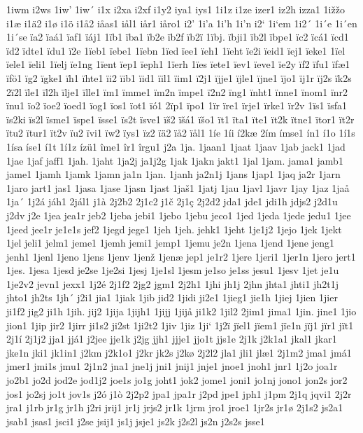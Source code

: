 1iwm
i2ws
1iw'
1iw´
i1x
i2xa
i2xf
i1y2
iya1
iys1
1i1z
i1ze
izer1
iz2h
izza1
1ižžo
i1æ
i1ä2
i1ø
i1ö
i1å2
iåas1
iål1
iår1
iåro1
i2'
1i'a
1i'h
1i'n
i2`
1i`em
1i2´
1i´e
1i´en
1i´se
ïa2
ïaá1
ïaf1
ïáj1
1ïb1
ïba1
ïb2e
ïb2f
ïb2ï
1ïbj.
ïbji1
ïb2l
ïbpe1
ïc2
ïcá1
ïcd1
ïd2
ïdte1
ïdu1
ï2e
1ïeb1
ïebe1
1ïebn
1ïed
ïee1
ïeh1
1ïeht
ïe2i
ïeid1
ïej1
ïeke1
1ïel
ïele1
ïeli1
1ïelj
ïe1ng
1ïent
ïep1
ïeph1
1ïerh
1ïes
ïete1
ïev1
ïeve1
ïe2y
ïf2
ïfu1
ïfæ1
ïfö1
ïg2
ïgke1
ïh1
ïhte1
ïi2
ïib1
ïid1
ïil1
ïim1
ï2j1
ïjje1
ïjle1
ïjne1
ïjo1
ïj1r
ïj2s
ïk2s
2ï2l
ïle1
ïl2h
ïlje1
ïlle1
ïm1
ïmme1
ïm2n
ïmpe1
ï2n2
ïng1
ïnht1
ïnne1
ïnom1
ïnr2
ïnu1
ïo2
ïoe2
ïoed1
ïog1
ïos1
ïot1
ïó1
2ïp1
ïpo1
1ïr
ïre1
ïrje1
ïrke1
ïr2v
1ïs1
ïsfa1
ïs2ki
ïs2l
ïsme1
ïspe1
ïsse1
ïs2t
ïsve1
ïš2
ïšá1
ïšo1
ït1
ïta1
ïte1
ït2k
ïtne1
ïtor1
ït2r
ïtu2
ïtur1
ït2v
ïu2
ïvi1
ïw2
ïys1
ïz2
ïä2
ïå2
ïål1
1íe
1íi
í2kæ
2ím
ímse1
ín1
í1o
1í1s
1ísa
íse1
í1t
1í1z
ízü1
îme1
îr1
îrgu1
j2a
1ja.
1jaan1
1jaat
1jaav
1jab
jack1
1jad
1jae
1jaf
jaff1
1jah.
1jaht
1ja2j
ja1j2g
1jak
1jakn
jakt1
1jal
1jam.
jama1
jamb1
jame1
1jamh
1jamk
1jamn
ja1n
1jan.
1janh
ja2n1j
1jans
1jap1
1jaq
ja2r
1jarn
1jaro
jart1
jas1
1jasa
1jase
1jasn
1jast
1jaš1
1jatj
1jau
1javl
1javr
1jay
1jaz
1jaå
1ja´
1j2á
jáh1
2jál1
j1à
2j2b2
2j1c2
j1č
2j1ç
2j2d2
jda1
jde1
jdi1h
jdjs2
j2d1u
j2dv
j2e
1jea
jea1r
jeb2
1jeba
jebi1
1jebo
1jebu
jeco1
1jed
1jeda
1jede
jedu1
1jee
1jeed
jee1r
je1e1s
jef2
1jegd
jege1
1jeh
1jeh.
jehk1
1jeht
1je1j2
1jejo
1jek
1jekt
1jel
jeli1
jelm1
jeme1
1jemh
jemi1
jemp1
1jemu
je2n
1jena
1jend
1jene
jeng1
jenh1
1jenl
1jeno
1jens
1jenv
1jenž
1jenæ
jep1
je1r2
1jere
1jeri1
1jer1n
1jero
jert1
1jes.
1jesa
1jesd
je2se
1je2si
1jesj
1je1sl
1jesm
je1so
je1ss
jesu1
1jesv
1jet
je1u
1je2v2
jevn1
jexx1
1j2é
2j1f2
2jg2
jgm1
2j2h1
1jhi
jh1j
2jhn
jhta1
jhti1
jh2t1j
jhto1
jh2ts
1jh´
j2i1
jia1
1jiak
1jib
jid2
1jidi
ji2e1
1jieg1
jie1h
1jiej
1jien
1jier
ji1f2
jig2
ji1h
1jih.
jij2
1jija
1jijh1
1jijj
1jijå
ji1k2
1jil2
2jim1
jima1
1jin.
jine1
1jio
jion1
1jip
jir2
1jirr
ji1s2
ji2st
1ji2t2
1jiv
1jiz
1ji`
1j2ï
jïel1
jïem1
jïe1n
jïj1
jïr1
jït1
2j1í
2j1j2
jja1
jjá1
j2jee
jje1k
j2jg
jjh1
jjje1
jjo1t
jjs1e
2j1k
j2k1a1
jkal1
jkar1
jke1n
jki1
jk1in1
j2km
j2k1o1
j2kr
jk2s
j2kø
2j2l2
jla1
jli1
jlæ1
2j1m2
jma1
jmá1
jmer1
jmi1s
jmu1
2j1n2
jna1
jne1j
jni1
jnij1
jnje1
jnoe1
jnoh1
jnr1
1j2o
joa1r
jo2b1
jo2d
jod2e
jod1j2
joe1s
jo1g
joht1
jok2
jome1
joni1
jo1nj
jono1
jon2s
jor2
jos1
jo2sj
jo1t
jov1s
j2ó
j1ò
2j2p2
jpa1
jpa1r
j2pd
jpe1
jph1
j1pm
2j1q
jqvi1
2j2r
jra1
j1rb
jr1g
jr1h
j2ri
jrij1
jr1j
jrjs2
jr1k
1jrm
jro1
jroe1
1jr2s
jr1ø
2j1s2
js2a1
jsab1
jsas1
jsci1
j2se
jsij1
js1j
jsje1
js2k
j2s2l
js2n
j2s2s
jsse1
